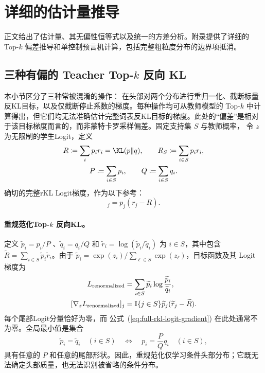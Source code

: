 \appendix
\section{详细的估计量推导}
\label{app:theory}

正文给出了估计量、其无偏性恒等式以及统一的方差分析。附录提供了详细的 Top-$k$ 偏差推导和单控制预言机计算，包括完整粗粒度分布的边界项抵消。

\subsection{三种有偏的 Teacher \texorpdfstring{Top-$k$}{Top-k} 反向 KL}
\label{app:topk-bias}

本小节区分了三种常被混淆的操作：
在头部对两个分布进行重归一化、截断标量反KL目标，以及仅截断停止系数的梯度。每种操作均可从教师模型的 Top-$k$ 中计算得出，但它们均无法准确估计完整词表反KL目标的梯度。此处的“偏差”是相对于该目标梯度而言的，而非蒙特卡罗采样偏差。固定支持集 $S$ 与教师概率，
令 $z$ 为无限制的学生Logit，定义
\begin{equation}
 \begin{gathered}
 R\coloneqq\sum_i p_i r_i=\KL(p\|q),\qquad
 R_S\coloneqq\sum_{i\in S}p_i r_i,\\
 P\coloneqq\sum_{i\in S}p_i,\qquad
 Q\coloneqq\sum_{i\in S}q_i.
 \end{gathered}
\end{equation}
确切的完整rKL Logit梯度，作为以下参考：
\begin{equation}
 [\nabla_z R]_j=p_j(r_j-R).
 \label{eq:full-rkl-logit-gradient}
\end{equation}

\paragraph{重规范化Top-$k$ 反向KL。}
定义 $\widetilde p_i=p_i/P$ 、$\widetilde q_i=q_i/Q$ 和 $\widetilde r_i=\log(\widetilde p_i/\widetilde q_i)$ 为 $i\in S$，其中包含 $\widetilde R=\sum_{i\in S}\widetilde p_i\widetilde r_i$。由于 $\widetilde p_i=\exp (z_i)/\sum_{\ell\in S}\exp (z_\ell)$，目标函数及其 Logit 梯度为
\begin{equation}
 \begin{aligned}
 L_{\mathrm{renormalized}}
 &=\sum_{i\in S}\widetilde p_i
   \log\frac{\widetilde p_i}{\widetilde q_i},\\
 [\nabla_z L_{\mathrm{renormalized}}]_j
 &=\mathbb{I}\{j\in S\}\widetilde p_j
   (\widetilde r_j-\widetilde R).
 \end{aligned}
 \label{eq:renorm-topk-gradient}
\end{equation}
每个尾部Logit分量恰好为零，而  
公式~(\ref{eq:full-rkl-logit-gradient}) 在此处通常不为零。全局最小值是集合
\begin{equation}
 \widetilde p_i=\widetilde q_i
 \quad(i\in S)
 \quad\Longleftrightarrow\quad
 p_i=\frac{P}{Q}q_i\quad(i\in S),
 \label{eq:renorm-topk-optimum}
\end{equation}
具有任意的 $P$  和任意的尾部形状。因此，重规范化仅学习条件头部分布；它既无法确定头部质量，也无法识别被省略的条件分布。

